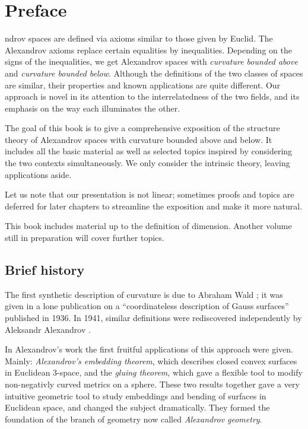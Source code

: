 \chapter*{Preface}


ndrov spaces are defined via axioms similar to those given by Euclid.
The Alexandrov axioms replace certain  equalities by inequalities. 
Depending on the signs of the inequalities, we get Alexandrov spaces with {}\emph{curvature bounded above} and {}\emph{curvature bounded below}.
Although the definitions of the two classes of spaces are similar, their properties and known applications are quite different.
Our approach is novel in its attention to the interrelatedness of the two fields, and its emphasis on the way each illuminates the other.


The goal of this book is to give a comprehensive exposition of the structure theory of Alexandrov spaces 
with curvature bounded above and below.
It includes all the basic material as well as selected topics inspired by considering the two contexts simultaneously.
We only consider  the intrinsic theory, leaving applications aside.

Let us note that our presentation is not linear;
sometimes proofs and topics are deferred for later chapters to streamline the exposition and make it more natural.

This book includes material up to the definition of dimension.
Another volume still in preparation will cover further topics.


\section*{Brief history}

The first synthetic description of curvature is due to Abraham Wald \cite{wald}; 
it was given in a lone publication on a ``coordinateless description of Gauss surfaces'' published in 1936.
In 1941, similar definitions were rediscovered independently by Aleksandr Alexandrov \cite{alexandrov:def}.

In Alexandrov's work the first fruitful applications of this approach were given.
Mainly: {}\emph{Alexandrov's embedding theorem}, which describes closed convex surfaces in Euclidean 3-space,
and the {}\emph{gluing theorem}, which gave a flexible tool to modify non-negativly curved metrics on a sphere.
These two results together gave  a very intuitive geometric tool to study embeddings and bending of surfaces in Euclidean space, and changed the subject dramatically.
They formed the foundation of the branch of geometry now called {}\emph{Alexandrov geometry}.


